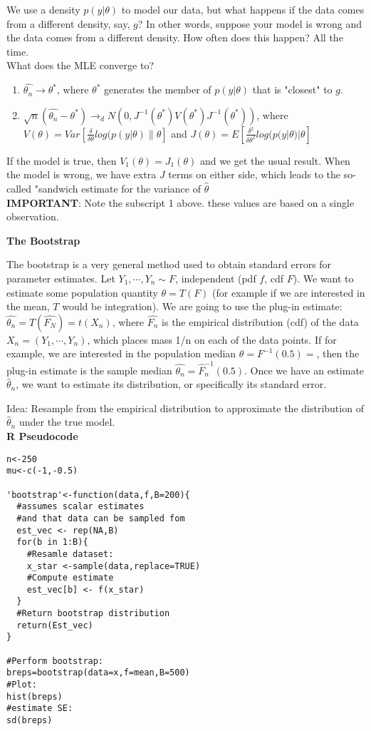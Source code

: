 \documentclass[12pt]{article}
\begin{document}
We use a density $p(y|\theta)$ to model our data, but what happens if the data comes from a different density, say, $g$? In other words, suppose your model is wrong and the data comes from a different density. How often does this happen? All the time.\\
What does the MLE converge to?\\
\begin{enumerate}
\item
$\hat{\theta_n} \rightarrow \theta^*$, where $\theta^*$ generates the member of $p(y|\theta)$ that is "closest" to $g$.\\
\item
$\sqrt{n}(\hat{\theta_n}-\theta^*)\rightarrow_d N(0, J^{-1}(\theta^*)V(\theta^*)J^{-1}(\theta^*))$, where  $V(\theta)=Var[\frac{\delta}{\delta \theta}log(p(y|\theta)\|\theta]$ and $J(\theta)=E[\frac{\delta^2}{\delta \theta^2}log(p(y|\theta)|\theta]$\\
\end{enumerate}
If the model is true, then $V_1(\theta)=J_1(\theta)$ and we get the usual result. When the model is wrong, we have extra $J$ terms on either side, which leads to the so-called "sandwich estimate for the variance of $\hat{\theta}$\\
\textbf{IMPORTANT}: Note the subscript 1 above. these values are based on a single observation.

\textbf{The Bootstrap}

The bootstrap is a very general method used to obtain standard errors for parameter estimates. Let $Y_1,\cdots, Y_n \sim F$, independent (pdf $f$, cdf $F$). We want to estimate some population quantity $\theta=T(F)$ (for example if we are interested in the mean, $T$ would be integration). We are going to use the plug-in estimate: $\hat{\theta_n}=T(\hat{F_N})=t(X_n)$, where $\hat{F_n}$ is the empirical distribution (cdf) of the data $X_n=(Y_1,\cdots,Y_n)$, which places mass 1/n on each of the data points. If for example, we are interested in the population median $\theta=F^{-1}(0.5)=$, then the plug-in estimate is the sample median $\hat{\theta_n}=\hat{F}_n^{-1}(0.5)$. Once we have an estimate $\hat{\theta}_n$, we want to estimate its distribution, or specifically its standard error.

Idea: Resample from the empirical distribution to approximate the distribution of $\hat{\theta}_n$ under the true model.\\

\textbf{R Pseudocode}
\begin{verbatim}
n<-250
mu<-c(-1,-0.5)

'bootstrap'<-function(data,f,B=200){
  #assumes scalar estimates
  #and that data can be sampled fom
  est_vec <- rep(NA,B)
  for(b in 1:B){
    #Resamle dataset:
    x_star <-sample(data,replace=TRUE)
    #Compute estimate
    est_vec[b] <- f(x_star)
  }
  #Return bootstrap distribution
  return(Est_vec)
}

#Perform bootstrap:
breps=bootstrap(data=x,f=mean,B=500)
#Plot:
hist(breps)
#estimate SE:
sd(breps)
\end{verbatim}
\end{document}
